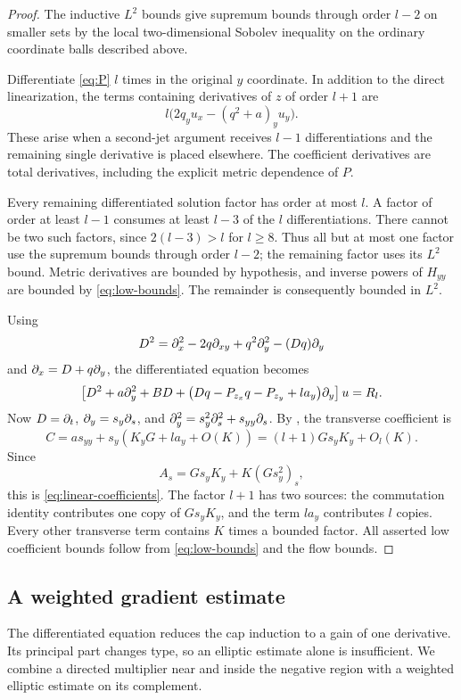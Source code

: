 \begin{proof}
The inductive \(L^2\) bounds give supremum bounds through order
\(l-2\) on smaller sets by the local two-dimensional Sobolev
inequality on the ordinary coordinate balls described above.

Differentiate \eqref{eq:P} \(l\) times in the original \(y\)
coordinate. In addition to the direct linearization, the terms
containing derivatives of \(z\) of order \(l+1\) are
\[
l\bigl(2q_yu_x-(q^2+a)_yu_y\bigr).
\]
These arise when a second-jet argument receives \(l-1\)
differentiations and the remaining single derivative is placed
elsewhere. The coefficient derivatives are total derivatives,
including the explicit metric dependence of \(P\).

Every remaining differentiated solution factor has order at most
\(l\). A factor of order at least \(l-1\) consumes at least \(l-3\)
of the \(l\) differentiations. There cannot be two such factors,
since \(2(l-3)>l\) for \(l\ge8\). Thus all but at most one factor
use the supremum bounds through order \(l-2\); the remaining factor
uses its \(L^2\) bound. Metric derivatives are bounded by hypothesis,
and inverse powers of \(H_{yy}\) are bounded by
\eqref{eq:low-bounds}. The remainder is consequently bounded in
\(L^2\).

Using
\[
D^2=\partial_x^2-2q\partial_{xy}+q^2\partial_y^2-(Dq)\partial_y
\]
and \(\partial_x=D+q\partial_y\), the differentiated equation becomes
\begin{equation}\label{eq:pre-flow}
\left[
D^2+a\partial_y^2+BD+
\bigl(Dq-P_{z_x}q-P_{z_y}+la_y\bigr)\partial_y
\right]u=R_l.
\end{equation}
Now \(D=\partial_t\), \(\partial_y=s_y\partial_s\), and
\(\partial_y^2=s_y^2\partial_s^2+s_{yy}\partial_s\).
By , the transverse coefficient is
\[
C=a s_{yy}+s_y(K_yG+la_y+O(K))
=(l+1)Gs_yK_y+O_l(K).
\]
Since
\[
A_s=Gs_yK_y+K(Gs_y^2)_s,
\]
this is \eqref{eq:linear-coefficients}. The factor \(l+1\) has two
sources: the commutation identity contributes one copy of
\(Gs_yK_y\), and the term \(la_y\) contributes \(l\) copies.
Every other transverse term contains \(K\) times a bounded factor.
All asserted low coefficient
bounds follow from \eqref{eq:low-bounds} and the flow bounds.
\end{proof}

\subsection{A weighted gradient estimate}

The differentiated equation reduces the cap induction to a gain
of one derivative. Its principal part changes type, so an elliptic
estimate alone is insufficient. We combine a directed multiplier
near and inside the negative region with a weighted elliptic
estimate on its complement.

